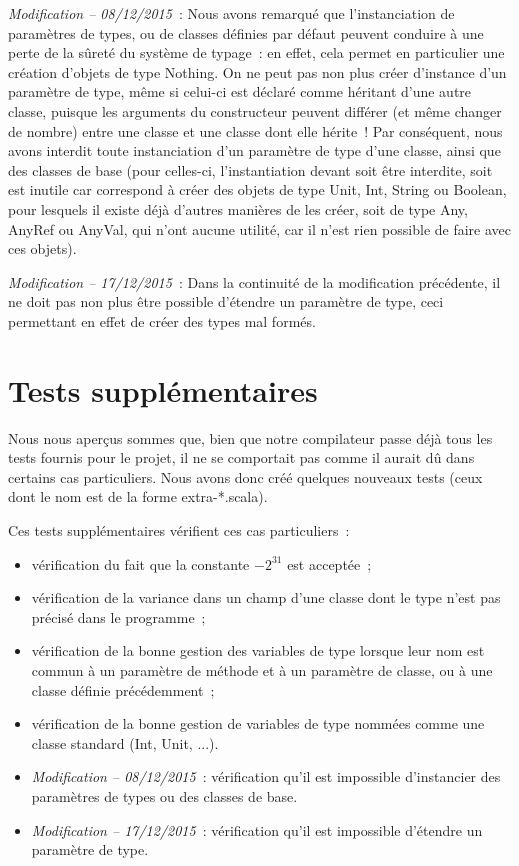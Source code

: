 \documentclass[a4paper,10pt]{article}
\newcommand{\code}[1]{{\fontfamily{pcr}\selectfont #1}}
\begin{document}
\textit{Modification -- 08/12/2015}~:
Nous avons remarqué que l'instanciation de paramètres de types, ou de
classes définies par défaut peuvent conduire à une perte de la sûreté
du système de typage~: en effet, cela permet en particulier une
création d'objets de type \code{Nothing}. On ne peut pas non plus
créer d'instance d'un paramètre de type, même si celui-ci est déclaré
comme héritant d'une autre classe, puisque les arguments du
constructeur peuvent différer (et même changer de nombre) entre une
classe et une classe dont elle hérite~! Par conséquent, nous avons
interdit toute instanciation d'un paramètre de type d'une classe,
ainsi que des classes de base (pour celles-ci, l'instantiation devant
soit être interdite, soit est inutile car correspond à créer des
objets de type \code{Unit}, \code{Int}, \code{String} ou
\code{Boolean}, pour lesquels il existe déjà d'autres manières de les
créer, soit de type \code{Any}, \code{AnyRef} ou \code{AnyVal}, qui
n'ont aucune utilité, car il n'est rien possible de faire avec ces
objets).

\textit{Modification -- 17/12/2015}~:
Dans la continuité de la modification précédente, il ne doit pas non
plus être possible d'étendre un paramètre de type, ceci permettant en
effet de créer des types mal formés.

\section{Tests supplémentaires}

Nous nous aperçus sommes que, bien que notre compilateur passe déjà
tous les tests fournis pour le projet, il ne se comportait pas comme
il aurait dû dans certains cas particuliers. Nous avons donc créé
quelques nouveaux tests (ceux dont le nom est de la forme
\code{extra-*.scala}).

Ces tests supplémentaires vérifient ces cas particuliers~:
\begin{itemize}
\item{vérification du fait que la constante $-2^{31}$ est acceptée~;}
\item{vérification de la variance dans un champ d'une classe dont le
    type n'est pas précisé dans le programme~;}
\item{vérification de la bonne gestion des variables de type lorsque
    leur nom est commun à un paramètre de méthode et à un paramètre de
  classe, ou à une classe définie précédemment~;}
\item{vérification de la bonne gestion de variables de type nommées
    comme une classe standard (\code{Int}, \code{Unit}, ...).}
\item{\textit{Modification -- 08/12/2015}~: vérification qu'il est
    impossible d'instancier des paramètres de types ou des classes de
    base.}
\item{\textit{Modification -- 17/12/2015}~: vérification qu'il est
    impossible d'étendre un paramètre de type.}
\end{itemize}
\end{document}

